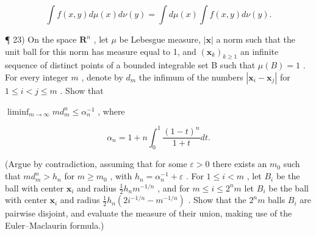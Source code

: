 \[
\int f (x, y) d \mu (x) d \nu (y) = \int d \mu (x) \int f (x, y) d \nu (y).
\]

¶ 23) On the space \(\mathbf{R}^n\) , let \(\mu\) be Lebesgue measure, \(|\mathbf{x}|\) a norm such that the unit ball for this norm has measure equal to 1, and \((\mathbf{x}_k)_{k \geqslant 1}\) an infinite sequence of distinct points of a bounded integrable set B such that \(\mu(B) = 1\) . For every integer \(m\) , denote by \(d_m\) the infimum of the numbers \(|\mathbf{x}_i - \mathbf{x}_j|\) for \(1 \leqslant i < j \leqslant m\) . Show that

\(\liminf_{m \to \infty} md_m^n \leqslant \alpha_n^{-1}\) , where

\[
\alpha_ {n} = 1 + n \int_ {0} ^ {1} \frac {(1 - t) ^ {n}}{1 + t} d t.
\]

(Argue by contradiction, assuming that for some \(\varepsilon > 0\) there exists an \(m_0\) such that \(md_m^n > h_n\) for \(m \geqslant m_0\) , with \(h_n = \alpha_n^{-1} + \varepsilon\) . For \(1 \leqslant i < m\) , let \(B_i\) be the ball with center \(\mathbf{x}_i\) and radius \(\frac{1}{2} h_n m^{-1/n}\) , and for \(m \leqslant i \leqslant 2^n m\) let \(B_i\) be the ball with center \(\mathbf{x}_i\) and radius \(\frac{1}{2} h_n (2i^{-1/n} - m^{-1/n})\) . Show that the \(2^n m\) balls \(B_i\) are pairwise disjoint, and evaluate the measure of their union, making use of the Euler--Maclaurin formula.)
